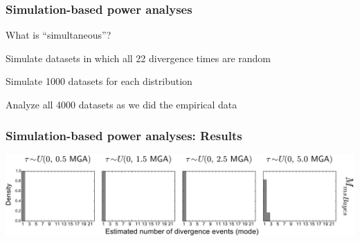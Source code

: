 \begin{frame}
    \frametitle{Simulation-based power analyses}
    What is ``simultaneous''?
    \begin{myitemize}
        \item<1-> Simulate datasets in which all 22 divergence times are random
        \item<2-> Simulate 1000 datasets for each \divTime{} distribution
        \item<2-> Analyze all 4000 datasets as we did the empirical data
    \end{myitemize}
\end{frame}

\begin{frame}[t]
    \frametitle{Simulation-based power analyses: Results}
    \vspace{1cm}
        \centerline{
        \includegraphics[width=1.13\textwidth]{../images/old_old_power_psi_mode.pdf}}
\end{frame}

